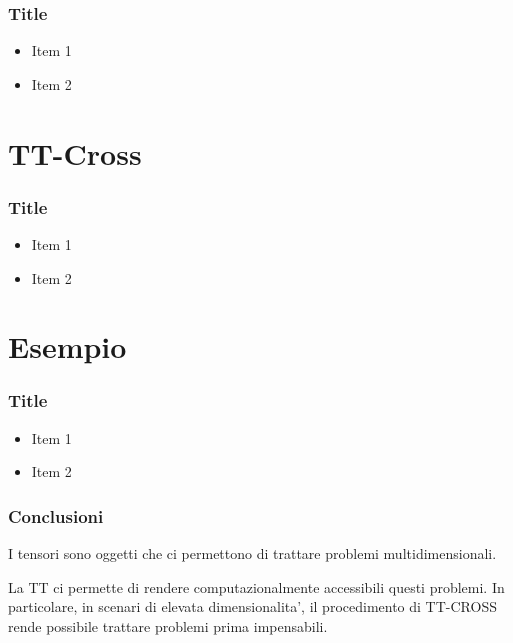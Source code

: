 \documentclass{beamer}
\theoremstyle{definition}
\theoremstyle{plain}
\begin{document}
\begin{frame}
\frametitle{Title}
\begin{itemize}
\item Item 1
\item Item 2
\end{itemize}
\end{frame}

\section{TT-Cross}
\begin{frame}
\frametitle{Title}
\begin{itemize}
\item Item 1
\item Item 2
\end{itemize}
\end{frame}

\section{Esempio}
\begin{frame}
\frametitle{Title}
\begin{itemize}
\item Item 1
\item Item 2
\end{itemize}
\end{frame}

\begin{frame}
\frametitle{Conclusioni}
I tensori sono oggetti che ci permettono di trattare problemi multidimensionali.

La TT ci permette di rendere computazionalmente accessibili questi problemi.
In particolare, in scenari di elevata dimensionalita', il procedimento di TT-CROSS rende possibile trattare problemi prima impensabili.
\end{frame}
\end{document}
